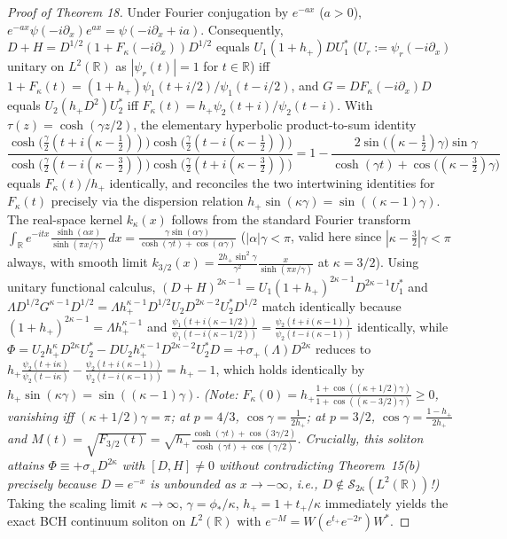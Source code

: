 \documentclass[10pt,letterpaper]{article}
\newcommand{\R}{\mathbb{R}}
\begin{document}
\begin{proof}[Proof of Theorem 18]
Under Fourier conjugation by $e^{-a x}$ ($a > 0$), $e^{-a x}\psi(-i\partial_x)e^{a x} = \psi(-i\partial_x + ia)$. Consequently, $D + H = D^{1/2}(1 + F_\kappa(-i\partial_x))D^{1/2}$ equals $U_1(1+h_+)D U_1^*$ ($U_r := \psi_r(-i\partial_x)$ unitary on $L^2(\R)$ as $|\psi_r(t)| = 1$ for $t \in \R$) iff $1 + F_\kappa(t) = (1+h_+)\psi_1(t+i/2)/\psi_1(t-i/2)$, and $G = D F_\kappa(-i\partial_x)D$ equals $U_2(h_+ D^2)U_2^*$ iff $F_\kappa(t) = h_+ \psi_2(t+i)/\psi_2(t-i)$. With $\tau(z) = \cosh(\gamma z/2)$, the elementary hyperbolic product-to-sum identity
\[
  \frac{\cosh\bigl(\frac{\gamma}{2}(t + i(\kappa-\frac{1}{2}))\bigr)\cosh\bigl(\frac{\gamma}{2}(t - i(\kappa-\frac{1}{2}))\bigr)}{\cosh\bigl(\frac{\gamma}{2}(t - i(\kappa-\frac{3}{2}))\bigr)\cosh\bigl(\frac{\gamma}{2}(t + i(\kappa-\frac{3}{2}))\bigr)}
  = 1 - \frac{2\sin\bigl((\kappa-\tfrac{1}{2})\gamma\bigr)\sin\gamma}{\cosh(\gamma t) + \cos\bigl((\kappa-\tfrac{3}{2})\gamma\bigr)}
\]
equals $F_\kappa(t)/h_+$ identically, and reconciles the two intertwining identities for $F_\kappa(t)$ precisely via the dispersion relation $h_+\sin(\kappa\gamma) = \sin((\kappa-1)\gamma)$. The real-space kernel $k_\kappa(x)$ follows from the standard Fourier transform $\int_{\R} e^{-itx}\frac{\sinh(\alpha x)}{\sinh(\pi x/\gamma)}\,dx = \frac{\gamma\sin(\alpha\gamma)}{\cosh(\gamma t) + \cos(\alpha\gamma)}$ ($|\alpha|\gamma < \pi$, valid here since $|\kappa - \frac{3}{2}|\gamma < \pi$ always, with smooth limit $k_{3/2}(x) = \frac{2h_+\sin^2\gamma}{\gamma^2}\frac{x}{\sinh(\pi x/\gamma)}$ at $\kappa = 3/2$). Using unitary functional calculus, $(D+H)^{2\kappa-1} = U_1(1+h_+)^{2\kappa-1} D^{2\kappa-1} U_1^*$ and $\Lambda D^{1/2} G^{\kappa-1} D^{1/2} = \Lambda h_+^{\kappa-1} D^{1/2} U_2 D^{2\kappa-2} U_2^* D^{1/2}$ match identically because $(1+h_+)^{2\kappa-1} = \Lambda h_+^{\kappa-1}$ and $\frac{\psi_1(t+i(\kappa-1/2))}{\psi_1(t-i(\kappa-1/2))} = \frac{\psi_2(t+i(\kappa-1))}{\psi_2(t-i(\kappa-1))}$ identically, while $\Phi = U_2 h_+^\kappa D^{2\kappa} U_2^* - D U_2 h_+^{\kappa-1} D^{2\kappa-2} U_2^* D = +\sigma_+(\Lambda) D^{2\kappa}$ reduces to $h_+\frac{\psi_2(t+i\kappa)}{\psi_2(t-i\kappa)} - \frac{\psi_2(t+i(\kappa-1))}{\psi_2(t-i(\kappa-1))} = h_+ - 1$, which holds identically by $h_+\sin(\kappa\gamma) = \sin((\kappa-1)\gamma)$. \emph{(Note: $F_\kappa(0) = h_+\frac{1+\cos((\kappa+1/2)\gamma)}{1+\cos((\kappa-3/2)\gamma)} \ge 0$, vanishing iff $(\kappa+1/2)\gamma = \pi$; at $p = 4/3$, $\cos\gamma = \frac{1}{2h_+}$; at $p = 3/2$, $\cos\gamma = \frac{1-h_+}{2h_+}$ and $M(t) = \sqrt{F_{3/2}(t)} = \sqrt{h_+}\frac{\cosh(\gamma t)+\cos(3\gamma/2)}{\cosh(\gamma t)+\cos(\gamma/2)}$. Crucially, this soliton attains $\Phi \equiv +\sigma_+ D^{2\kappa}$ with $[D, H] \neq 0$ without contradicting Theorem~15(b) precisely because $D = e^{-x}$ is unbounded as $x \to -\infty$, i.e., $D \notin \mathcal{S}_{2\kappa}(L^2(\R))$!)} Taking the scaling limit $\kappa \to \infty$, $\gamma = \phi_*/\kappa$, $h_+ = 1 + t_+/\kappa$ immediately yields the exact BCH continuum soliton on $L^2(\R)$ with $e^{-M} = W(e^{t_+}e^{-2r})W^*$.


\end{proof}
\end{document}
